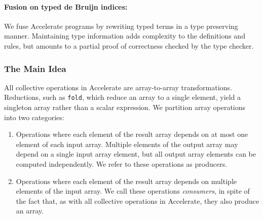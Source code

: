 \paragraph{Fusion on typed de Bruijn indices:} We fuse Accelerate programs by
rewriting typed  terms in a type preserving manner.
Maintaining type information adds complexity to the definitions and rules, but
amounts to a partial proof of correctness checked by the type checker.


\subsubsection{The Main Idea}

All collective operations in Accelerate are array-to-array transformations.
Reductions, such as \texttt{fold}, which reduce an array to a single element,
yield a singleton array rather than a scalar expression. We partition array
operations into two categories:

\begin{enumerate}
    \item Operations where each element of the result array depends on at most
        one element of each input array. Multiple elements of the output array
        may depend on a single input array element, but all output array
        elements can be computed independently. We refer to these operations as
        producers.

    \item Operations where each element of the result array depends on multiple
        elements of the input array. We call these operations
        \emph{consumers}, in spite of the fact that, as with all
        collective operations in Accelerate, they also produce an array.
\end{enumerate}

